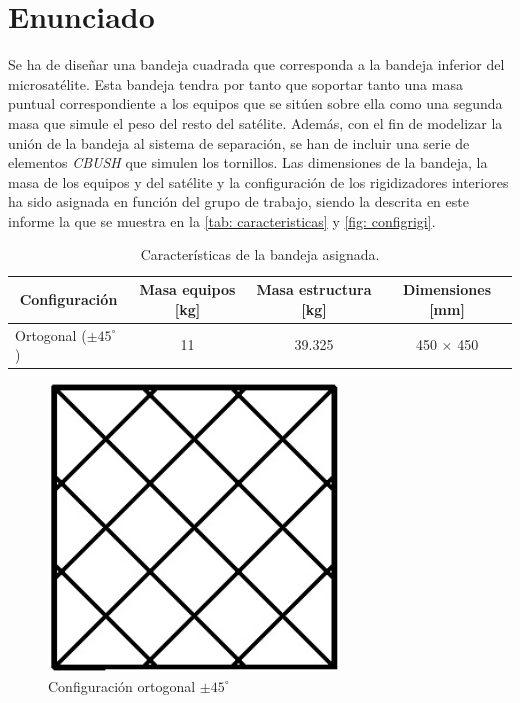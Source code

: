 \section{Enunciado}

Se ha de diseñar una bandeja cuadrada que corresponda a la bandeja inferior del microsatélite. Esta bandeja tendra por tanto que soportar tanto una masa puntual correspondiente a los equipos que se sitúen sobre ella como una segunda masa que simule el peso del resto del satélite. Además, con el fin de modelizar la unión de la bandeja al sistema de separación, se han de incluir una serie de elementos \textit{CBUSH} que simulen los tornillos. Las dimensiones de la bandeja, la masa de los equipos y del satélite y la configuración de los rigidizadores interiores ha sido asignada en función del grupo de trabajo, siendo la descrita en este informe la que se muestra en la \autoref{tab: caracteristicas} y \autoref{fig: configrigi}.

\begin{table}[H]
\centering
\caption{Características de la bandeja asignada.}
\label{tab: caracteristicas}
\begin{tabular}{l c c c}
\toprule
\multicolumn{1}{c}{\textbf{Configuración}}  & \multicolumn{1}{c}{\textbf{Masa equipos} [kg]}   & \multicolumn{1}{c}{\textbf{Masa estructura} [kg]} & \multicolumn{1}{c}{\textbf{Dimensiones} [mm]} \\ \midrule
  Ortogonal ($\pm 45^{\circ}$ )  & 11 & 39.325 & 450 $\times$ 450 \\ \bottomrule
\end{tabular}
\end{table}

\begin{figure}[H]
    \centering
    \includegraphics[scale=0.7]{Figures/Config.png}
    \caption{Configuración ortogonal $\pm 45^{\circ}$}
    \label{fig: configrigi}
\end{figure}

